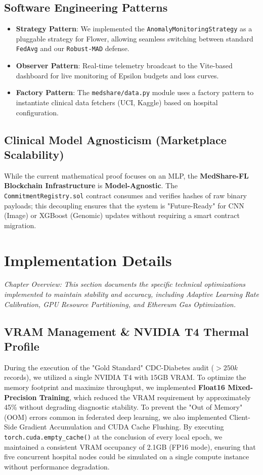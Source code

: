 \documentclass[10pt, a4paper, twocolumn]{article}
\begin{document}
\subsection{Software Engineering Patterns}
\begin{itemize}
    \item \textbf{Strategy Pattern}: We implemented the \texttt{AnomalyMonitoringStrategy} as a pluggable strategy for Flower, allowing seamless switching between standard \texttt{FedAvg} and our \texttt{Robust-MAD} defense.
    \item \textbf{Observer Pattern}: Real-time telemetry broadcast to the Vite-based dashboard for live monitoring of Epsilon budgets and loss curves.
    \item \textbf{Factory Pattern}: The \texttt{medshare/data.py} module uses a factory pattern to instantiate clinical data fetchers (UCI, Kaggle) based on hospital configuration.
\end{itemize}

\subsection{Clinical Model Agnosticism (Marketplace Scalability)}
While the current mathematical proof focuses on an MLP, the \textbf{MedShare-FL Blockchain Infrastructure} is \textbf{Model-Agnostic}. The \texttt{CommitmentRegistry.sol} contract consumes and verifies hashes of raw binary payloads; this decoupling ensures that the system is "Future-Ready" for CNN (Image) or XGBoost (Genomic) updates without requiring a smart contract migration.

\section{Implementation Details}

\textit{Chapter Overview: This section documents the specific technical optimizations implemented to maintain stability and accuracy, including Adaptive Learning Rate Calibration, GPU Resource Partitioning, and Ethereum Gas Optimization.}

\subsection{VRAM Management \& NVIDIA T4 Thermal Profile}
During the execution of the "Gold Standard" CDC-Diabetes audit ($>250k$ records), we utilized a single NVIDIA T4 with 15GB VRAM. To optimize the memory footprint and maximize throughput, we implemented \textbf{Float16 Mixed-Precision Training}, which reduced the VRAM requirement by approximately 45\% without degrading diagnostic stability. To prevent the "Out of Memory" (OOM) errors common in federated deep learning, we also implemented Client-Side Gradient Accumulation and CUDA Cache Flushing. By executing \texttt{torch.cuda.empty\_cache()} at the conclusion of every local epoch, we maintained a consistent VRAM occupancy of 2.1GB (FP16 mode), ensuring that five concurrent hospital nodes could be simulated on a single compute instance without performance degradation.
\end{document}
